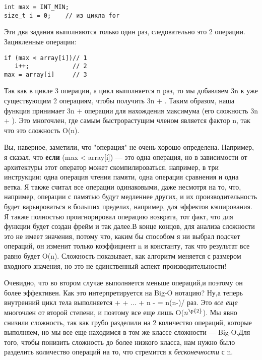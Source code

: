 \vspace{\baselineskip}
\begin{tcolorbox}
\begin{verbatim}
int max = INT_MIN;
size_t i = 0;    // из цикла for
\end{verbatim}
\end{tcolorbox}


\vspace{\baselineskip}
Эти два задания выполняются только один раз, следовательно это 2 операции. Зацикленные операции:

\vspace{\baselineskip}
\begin{tcolorbox}
\begin{verbatim}
if (max < array[i])// 1
   i++;            // 2
max = array[i]     // 3
\end{verbatim}
\end{tcolorbox}

\vspace{\baselineskip}
Так как в цикле 3 операции, а цикл выполняется n раз, то мы добавляем 3n к уже существующим 2 операциям, чтобы получить 3n + . Таким образом, наша функция принимает 3n +  операции для нахождения максимума (его сложность 3n + ). Это многочлен, где самым быстрорастущим членом является фактор n, так что это сложность  O(n).

\vspace{\baselineskip}
 Вы, наверное, заметили, что "операция" не очень хорошо определена. Например, я сказал, что \textbf{если} (max < array[i]) --- это одна операция, но в зависимости от архитектуры этот оператор может скомпилироваться, например, в три инструкции: одна операция чтения памяти, одна операция сравнения и одна ветка. Я также считал все операции одинаковыми, даже несмотря на то, что, например, операции с памятью будут медленнее других, и их производительность будет варьироваться в больших пределах, например, для эффектов кэширования. Я также полностью проигнорировал операцию возврата, тот факт, что для функции будет создан фрейм и так далее.В конце концов, для анализа сложности это не имеет значения, потому что, каким бы способом я ни выбрал подсчет операций, он изменит только коэффициент n и константу, так что результат все равно будет O(n). Сложность показывает, как алгоритм меняется с размером входного значения, но это не единственный аспект производительности!
 
\vspace{\baselineskip}
Очевидно, что во втором случае выполняется меньше операций,и поэтому он более эффективен. Как это интерпретируется на Big-O нотацию? Ну,а теперь внутренний цикл тела выполняется  +  + ... + n -  = n(n-)/ раз. Это \textit{все еще} многочлен от
второй степени, и поэтому все еще лишь O($n^{\p{2}}$). Мы явно снизили сложность, так как грубо разделили на
2 количество операций, которые выполняем, но мы все еще находимся в том же классе сложности --- Big-O.Для того, 
чтобы понизить сложность до более низкого класса, нам нужно было разделить количество операций на то, что
стремится к \textit{бесконечности} с n.


